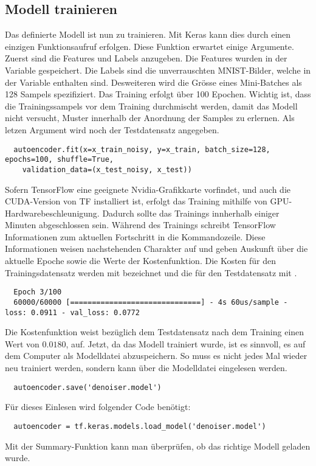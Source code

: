 \subsection{Modell trainieren}
Das definierte Modell ist nun zu trainieren.
Mit Keras kann dies durch einen einzigen Funktionsaufruf erfolgen.
Diese Funktion erwartet einige Argumente. Zuerst sind die Features und Labels anzugeben. Die
Features wurden in der Variable  gespeichert. Die Labels
sind die unverrauschten MNIST-Bilder, welche in der Variable  enthalten sind.
Desweiteren wird die Grösse eines Mini-Batches als 128 Sampels spezifiziert. Das
Training erfolgt über 100 Epochen.
Wichtig ist, dass die Trainingssampels vor dem Training durchmischt werden,
damit das Modell nicht versucht, Muster innerhalb der Anordnung der Samples zu
erlernen. Als letzen Argument wird noch der Testdatensatz angegeben.
\begin{verbatim}
  autoencoder.fit(x=x_train_noisy, y=x_train, batch_size=128, epochs=100, shuffle=True,
    validation_data=(x_test_noisy, x_test))
\end{verbatim}
Sofern TensorFlow eine geeignete Nvidia-Grafikkarte vorfindet, und auch die
CUDA-Version von TF installiert ist, erfolgt das Training mithilfe von GPU-Hardwarebeschleunigung.
Dadurch sollte das Trainings innherhalb einiger Minuten abgeschlossen sein.
Während des Trainings schreibt TensorFlow Informationen zum aktuellen Fortschritt in die
Kommandozeile. Diese Informationen weisen nachstehenden Charakter auf und geben
Auskunft über die aktuelle Epoche sowie die Werte der Kostenfunktion. Die Kosten
für den Trainingsdatensatz werden mit  bezeichnet und die für den
Testdatensatz mit .

\begin{verbatim}
  Epoch 3/100
  60000/60000 [==============================] - 4s 60us/sample - loss: 0.0911 - val_loss: 0.0772
\end{verbatim}
Die Kostenfunktion weist bezüglich dem Testdatensatz nach dem Training einen Wert  von $0.0180$,
auf.
\para{}
Jetzt, da das Modell trainiert wurde, ist es sinnvoll, es auf dem Computer als
Modelldatei abzuspeichern. So muss es nicht jedes Mal wieder neu trainiert werden, sondern kann über
die Modelldatei eingelesen werden.
\begin{verbatim}
  autoencoder.save('denoiser.model')
\end{verbatim}
Für dieses Einlesen wird folgender Code benötigt:
\begin{verbatim}
  autoencoder = tf.keras.models.load_model('denoiser.model')
\end{verbatim}
Mit der Summary-Funktion kann man überprüfen, ob das richtige Modell geladen wurde.

